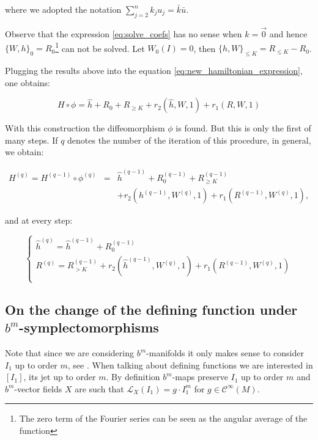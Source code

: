 where we adopted the notation $\sum_{j = 2}^n k_ju_j = \bar{k}\bar{u}$.

\begin{remark}
Observe that the expression \ref{eq:solve_coefs} has no sense when $k = \vec{0}$ and hence $\{W,h\}_0=R_0$\footnote{The zero term of the Fourier series can be seen as the angular average of the function} can not be solved. Let $W_0(I)=0$, then $\{h,W\}_{\leq K} = R_{\leq K} -R_0$.
\end{remark}

Plugging the results above into the equation  \ref{eq:new_hamiltonian_expression}, one obtains:

$$
H\circ\phi = \hat{h}  + R_0 + R_{\geq K} + r_2(\hat{h},W,1) + r_1(R,W,1)
$$

With this construction the diffeomorphism $\phi$ is found. But this is  only the first of many steps. If $q$ denotes the number of the iteration of this procedure, in general, we obtain:

\begin{equation}
\begin{array}{rcl}
H^{(q)}  =  H^{(q-1)}\circ\phi^{(q)} & = &  \hat{h}^{(q-1)}  + R_0^{(q-1)} + R_{\geq K}^{(q-1)} \\
& & + r_2(h^{(q-1)},W^{(q)},1) + r_1(R^{(q-1)},W^{(q)},1),
\end{array}
\end{equation}

and at every step:

\begin{equation}\label{eq:iterative_h_and_R}
\begin{cases}
\hat{h}^{(q)}  =  \hat{h}^{(q-1)} + R_0^{(q-1)}\\
R^{(q)}  =  R_{>K}^{(q-1)} + r_2(\hat{h}^{(q-1)}, W^{(q)},1) + r_1(R^{(q-1)}, W^{(q)},1)\\
\end{cases}
\end{equation}

\subsection{On the change of the defining function under \\ $b^m$-symplectomorphisms}

Note that since we are considering $b^m$-manifolds it only makes sense to consider $I_1$ up to order $m$, see \cite{Scott16}. When talking about defining functions we are interested in $[I_1]$, its jet up to order $m$.
By definition $b^m$-maps preserve $I_1$ up to order $m$ and $b^m$-vector fields $X$ are such that $\mathcal{L}_X(I_1) = g\cdot I_1^m$ for $g\in\mathcal{C}^\infty(M)$.

